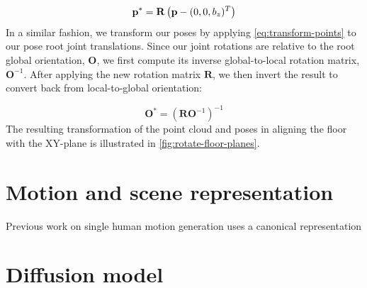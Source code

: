 \begin{equation} \label{eq:transform-points}
    \boldsymbol{\mathbf{p}}^* = \mathbf{R} \left(\boldsymbol{\mathbf{p}} - (0, 0, b_z)^T \right) 
\end{equation}
In a similar fashion, we transform our poses by applying \cref{eq:transform-points} to our pose root joint translations. Since our joint rotations are relative to the root global orientation, $\mathbf{O}$, we first compute its inverse global-to-local rotation matrix, $\mathbf{O}^{-1}$. After applying the new rotation matrix $\mathbf{R}$, we then invert the result to convert back from local-to-global orientation:

\begin{equation}
    \mathbf{O}^* = \left(\mathbf{R} \mathbf{O}^{-1} \right)^{-1}
\end{equation}
The resulting transformation of the point cloud and poses in aligning the floor with the XY-plane is illustrated in \cref{fig:rotate-floor-planes}.

\section{Motion and scene representation}
Previous work on single human motion generation uses a canonical representation 



\section{Diffusion model}



